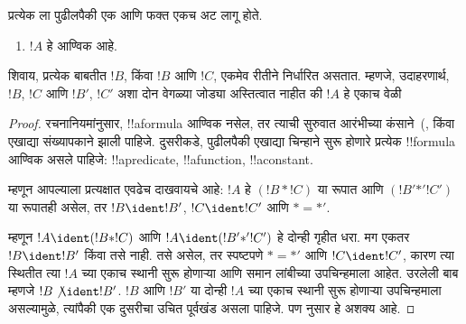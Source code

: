 \documentclass[../../../include/open-logic-section]{subfiles}
\begin{document}
\begin{prop}[एकमेव वाचनीयता]
प्रत्येक ला पुढीलपैकी एक आणि फक्त एकच अट लागू होते.
\begin{enumerate}
\item $!A$ हे आण्विक आहे.







\end{enumerate}
शिवाय, प्रत्येक बाबतीत $!B$, किंवा $!B$ आणि $!C$, एकमेव रीतीने
निर्धारित असतात. म्हणजे, उदाहरणार्थ, $!B$, $!C$ आणि $!B'$, $!C'$ अशा
दोन वेगळ्या जोड्या अस्तित्वात नाहीत की $!A$ हे एकाच वेळी
\end{prop}

\begin{proof}
रचनानियमांनुसार, !!a{formula} आण्विक नसेल, तर त्याची सुरुवात आरंभीच्या
कंसाने~(,  किंवा एखाद्या संख्यापकाने झाली
पाहिजे. दुसरीकडे, पुढीलपैकी एखाद्या चिन्हाने सुरू होणारे प्रत्येक
!!{formula} आण्विक असले पाहिजे: !!a{predicate}, !!a{function},
!!a{constant}.

म्हणून आपल्याला प्रत्यक्षात एवढेच दाखवायचे आहे: $!A$ हे $(!B \ast
!C)$ या रूपात आणि $(!B' \mathbin{\ast'} !C')$ या रूपातही असेल, तर
$!B \ident !B'$, $!C \ident !C'$ आणि $\ast = {\ast'}$.

म्हणून $!A \ident (!B \ast !C)$ आणि $!A \ident (!B'
\mathbin{\ast'} !C')$ हे दोन्ही गृहीत धरा. मग एकतर $!B \ident !B'$
किंवा तसे नाही. तसे असेल, तर स्पष्टपणे $\ast = {\ast'}$ आणि $!C
\ident !C'$, कारण त्या स्थितीत त्या $!A$ च्या एकाच स्थानी सुरू होणाऱ्या
आणि समान लांबीच्या उपचिन्हमाला आहेत. उरलेली बाब म्हणजे $!B
\not\ident !B'$. $!B$ आणि $!B'$ या दोन्ही $!A$ च्या एकाच स्थानी सुरू
होणाऱ्या उपचिन्हमाला असल्यामुळे, त्यांपैकी एक दुसरीचा उचित पूर्वखंड
असला पाहिजे. पण  नुसार हे अशक्य आहे.
\end{proof}
\end{document}

